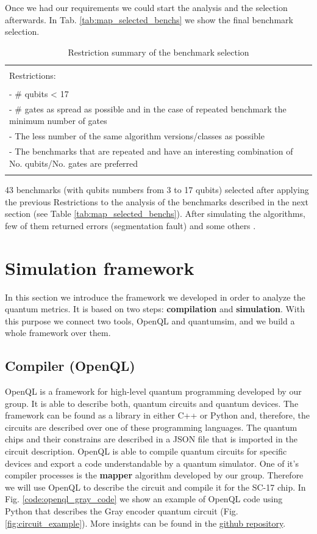 Once we had our requirements we could start the analysis and the selection afterwards.
In Tab. \ref{tab:map_selected_benchs} we show the final benchmark selection.
\begin{table}[htbp]
\caption{\label{tab:orgc867dfc}
Restriction summary of the benchmark selection}
\centering
\begin{tabular}{|l|}
\hline
\\
Restrictions:\\
\\
- \# qubits < 17\\
- \# gates as spread as possible and in the case of repeated benchmark the minimum number of gates\\
- The less number of the same algorithm versions/classes as possible\\
- The benchmarks that are repeated and have an interesting combination of No. qubits/No. gates are  preferred\\
\\
\hline
\end{tabular}
\end{table}
43 benchmarks (with qubits numbers from 3 to 17 qubits) selected after applying the previous Restrictions to the analysis of the benchmarks described in the next section (see Table \ref{tab:map_selected_benchs}).
After simulating the algorithms, few of them returned errors (segmentation fault) and some others .

\section*{Simulation framework}
\label{sec:org311b249}
In this section we introduce the framework we developed in order to analyze the quantum metrics.
It is based on two steps: \textbf{compilation} and \textbf{simulation}.
With this purpose we connect two tools, OpenQL and quantumsim, and we build a whole framework over them.

\subsection*{Compiler (OpenQL)}
\label{sec:orgff7c703}
OpenQL is a framework for high-level quantum programming developed by our group.
It is able to describe both, quantum circuits and quantum devices.
The framework can be found as a library in either C++ or Python and, therefore, the circuits are described over one of these programming languages.
The quantum chips and their constrains are described in a JSON file that is imported in the circuit description.
OpenQL is able to compile quantum circuits for specific devices and export a code understandable by a quantum simulator.
One of it's compiler processes is the \textbf{mapper} algorithm developed by our group.
Therefore we will use OpenQL to describe the circuit and compile it for the SC-17 chip.
In Fig. \ref{code:openql_gray_code} we show an example of OpenQL code using Python that describes the Gray encoder quantum circuit (Fig. \ref{fig:circuit_example}).
More insights can be found in the \href{https://github.com/QE-Lab/OpenQL}{github repository}.

